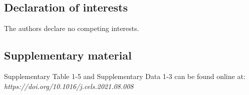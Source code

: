 \subsection{Declaration of interests}
The authors declare no competing interests.
\clearpage
\begin{subappendices}

  \section{Supplementary material}
  \beginsupplement
  Supplementary Table 1-5 and Supplementary Data 1-3 can be found online at:\\
  \emph{https://doi.org/10.1016/j.cels.2021.08.008}\\

  \vspace{24cm}

  \label{data:datadummy3.1}
  \label{data:datadummy3.2}
  \label{data:datadummy3.3}
  \addtocounter{table}{-3}
  \label{tab:tabdummy3.1}
  \label{tab:tabdummy3.2}
  \label{tab:tabdummy3.3}
  \label{tab:tabdummy3.4}
  \label{tab:tabdummy3.5}
  \addtocounter{table}{-6}


\end{subappendices}
